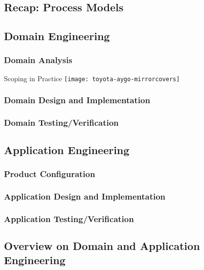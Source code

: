 \subsection{Recap: Process Models}

\subsection{Domain Engineering}

\subsubsection{Domain Analysis}
\begin{frame}{Scoping in Practice}
	\centering\texttt{[image: toyota-aygo-mirrorcovers]}
\end{frame}

\subsubsection{Domain Design and Implementation}
\subsubsection{Domain Testing/Verification}

\subsection{Application Engineering}

\subsubsection{Product Configuration}
\subsubsection{Application Design and Implementation}
\subsubsection{Application Testing/Verification}

\subsection{Overview on Domain and Application Engineering}


